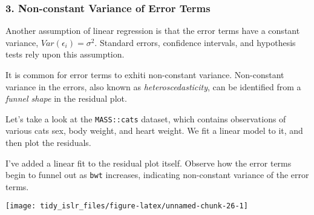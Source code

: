 \documentclass[]{book}
\newenvironment{Shaded}{\begin{snugshade}}{\end{snugshade}}
\newcommand{\DataTypeTok}[1]{\textcolor[rgb]{0.13,0.29,0.53}{#1}}
\newcommand{\FloatTok}[1]{\textcolor[rgb]{0.00,0.00,0.81}{#1}}
\newcommand{\KeywordTok}[1]{\textcolor[rgb]{0.13,0.29,0.53}{\textbf{#1}}}
\newcommand{\NormalTok}[1]{#1}
\newcommand{\OperatorTok}[1]{\textcolor[rgb]{0.81,0.36,0.00}{\textbf{#1}}}
\newcommand{\StringTok}[1]{\textcolor[rgb]{0.31,0.60,0.02}{#1}}
\begin{document}
\hypertarget{non-constant-variance-of-error-terms}{%
\subsubsection{3. Non-constant Variance of Error Terms}\label{non-constant-variance-of-error-terms}}

Another assumption of linear regression is that the error terms have a constant variance, \(Var(\epsilon_i) = \sigma^2\). Standard errors, confidence intervals, and hypothesis tests rely upon this assumption.

It is common for error terms to exhiti non-constant variance. Non-constant variance in the errors, also known as \emph{heteroscedasticity}, can be identified from a \emph{funnel shape} in the residual plot.

Let's take a look at the \texttt{MASS::cats} dataset, which contains observations of various cats sex, body weight, and heart weight. We fit a linear model to it, and then plot the residuals.

I've added a linear fit to the residual plot itself. Observe how the error terms begin to funnel out as \texttt{bwt} increases, indicating non-constant variance of the error terms.

\begin{Shaded}
\end{Shaded}

\begin{center}\texttt{[image: tidy\_islr\_files/figure-latex/unnamed-chunk-26-1]} \end{center}
\end{document}
